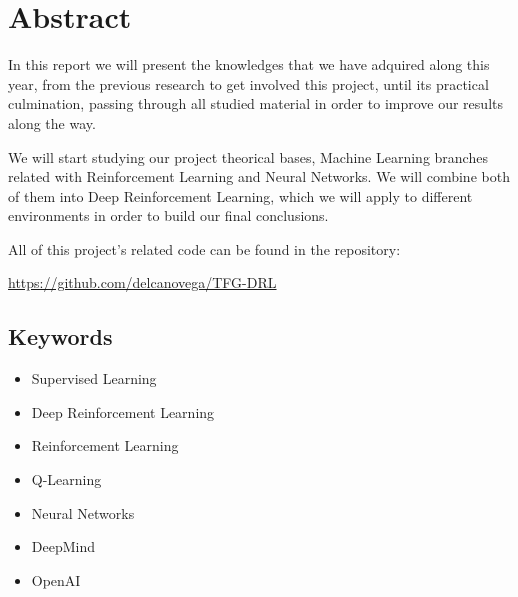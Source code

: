 \chapter*{Abstract}

In this report we will present the knowledges that we have adquired along this year, from the previous research to get involved this project, until its practical culmination, passing through all studied material in order to improve our results along the way.

We will start studying our project theorical bases, Machine Learning branches related with Reinforcement Learning and Neural Networks. We will combine both of them into Deep Reinforcement Learning, which we will apply to different environments in order to build our final conclusions.

All of this project's related code can be found in the repository:

\url{https://github.com/delcanovega/TFG-DRL}

\section*{Keywords}

\begin{itemize}
    \item Supervised Learning
    \item Deep Reinforcement Learning
    \item Reinforcement Learning
    \item Q-Learning
    \item Neural Networks
    \item DeepMind 
    \item OpenAI
\end{itemize}
   



